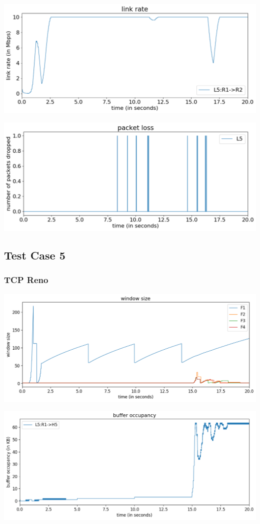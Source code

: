 \documentclass{article}
\begin{document}
\includegraphics[width = \textwidth]{"test_case4 link rate"}

\includegraphics[width = \textwidth]{"test_case4 packet loss"}





\subsection{Test Case 5}

\subsubsection{TCP Reno}

\includegraphics[width = \textwidth]{"test_case5_reno window size"}

\includegraphics[width = \textwidth]{"test_case5_reno buffer occupancy"}
\end{document}
